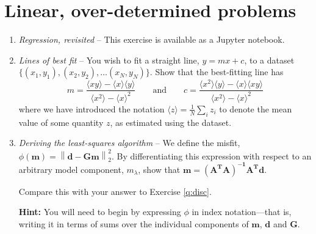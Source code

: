 \documentclass[a4paper,11pt]{article}
\newenvironment{hint}{
	\begin{mdframed}[backgroundcolor=gray!10,roundcorner=5pt]\textbf{Hint:} }{
	\end{mdframed}}
\begin{document}
\section{Linear, over-determined problems}
\begin{enumerate}[resume]

\item \textit{Regression, revisited}\label{q:basiclsq} -- This exercise is available as a Jupyter notebook.


\item \textit{Lines of best fit} -- 
You wish to fit a straight line, $y=mx+c$, to a dataset $\{(x_1,y_1), (x_2,y_2),\ldots(x_N,y_N)\}$. Show that the best-fitting line has
\[
m =  \frac{\langle xy\rangle - \langle x \rangle \langle y \rangle}{\langle x^2\rangle - \langle x \rangle^2}\quad\quad\textrm{and}\quad\quad
c = \frac{\langle x^2\rangle \langle y\rangle - \langle x\rangle\langle xy\rangle}{\langle x^2\rangle - \langle x\rangle^2}
\]
where we have introduced the notation $\langle z \rangle = \frac{1}{N}\sum_i z_i$ to denote the mean value of some quantity $z$, as estimated using the dataset.

\item \textit{Deriving the least-squares algorithm}\label{q:lsderiv} -- 
We define the misfit, $\phi(\mathbf{m}) = \left\|\mathbf{d} - \mathbf{Gm}\right\|_2^2$. By differentiating this expression with respect to an arbitrary model component, $m_\lambda$, show that $\mathbf{m} = (\mathbf{A^TA})^\mathbf{-1}\mathbf{A^Td}$.

Compare this with your answer to Exercise \ref{q:disc}.
\begin{hint}
You will need to begin by expressing $\phi$ in index notation---that is, writing it in terms of sums over the individual components of $\mathbf{m}$, $\mathbf{d}$ and $\mathbf{G}$.
\end{hint}
\end{enumerate}

 
\end{document}

